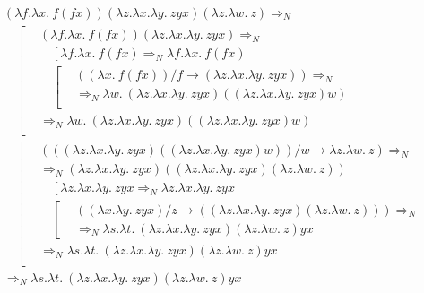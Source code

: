\documentclass{article}
\begin{document}
\begin{equation*}
  \begin{aligned}
    &(\lambda f.\lambda x.\ f(fx))(\lambda z.\lambda x.\lambda y.\ zyx)(\lambda z.\lambda w.\ z) \Rightarrow_N \\ 
    &\quad\left[
      \begin{aligned}
        &(\lambda f.\lambda x.\ f(fx))(\lambda z.\lambda x.\lambda y.\ zyx) \Rightarrow_N \\ 
          &\quad\left[\lambda f.\lambda x.\ f(fx) \Rightarrow_N \lambda f.\lambda x.\ f(fx)\right. \\ 
          &\quad\left[
            \begin{aligned}
              &((\lambda x.\ f(fx))/f \to (\lambda z.\lambda x.\lambda y.\ zyx)) \Rightarrow_N \\
              &\Rightarrow_N \lambda w.\ (\lambda z.\lambda x.\lambda y.\ zyx)((\lambda z.\lambda x.\lambda y.\ zyx)w) \\
            \end{aligned}
          \right. \\ 
        &\Rightarrow_N \lambda w.\ (\lambda z.\lambda x.\lambda y.\ zyx)((\lambda z.\lambda x.\lambda y.\ zyx)w) \\
      \end{aligned}
    \right. \\
    &\quad\left[
      \begin{aligned}
        &(((\lambda z.\lambda x.\lambda y.\ zyx)((\lambda z.\lambda x.\lambda y.\ zyx)w)) / w \to \lambda z.\lambda w.\ z) \Rightarrow_N \\ 
        &\Rightarrow_N (\lambda z.\lambda x.\lambda y.\ zyx)((\lambda z.\lambda x.\lambda y.\ zyx)(\lambda z.\lambda w.\ z)) \\ 
          &\quad\left[\lambda z.\lambda x.\lambda y.\ zyx \Rightarrow_N \lambda z.\lambda x.\lambda y.\ zyx\right. \\ 
          &\quad\left[
            \begin{aligned}
              &((\lambda x.\lambda y.\ zyx) / z \to ((\lambda z.\lambda x.\lambda y.\ zyx)(\lambda z.\lambda w.\ z))) \Rightarrow_N \\ 
              &\Rightarrow_N \lambda s.\lambda t.\ (\lambda z.\lambda x.\lambda y.\ zyx)(\lambda z.\lambda w.\ z)yx
            \end{aligned}
          \right. \\ 
        &\Rightarrow_N \lambda s.\lambda t.\ (\lambda z.\lambda x.\lambda y.\ zyx)(\lambda z.\lambda w.\ z)yx \\
      \end{aligned}
    \right. \\ 
    &\Rightarrow_N \lambda s.\lambda t.\ (\lambda z.\lambda x.\lambda y.\ zyx)(\lambda z.\lambda w.\ z)yx
  \end{aligned}
\end{equation*}
\end{document}
